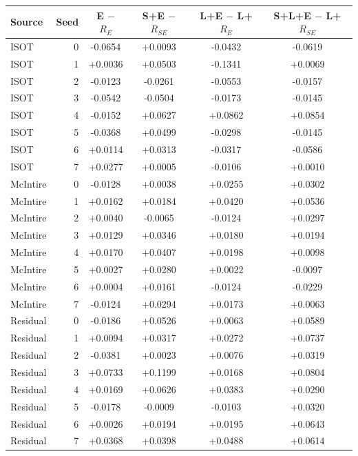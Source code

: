 \begin{tabular}{@{}lrcccc@{}}
\toprule
Source & Seed & E $-$ $R_E$ & S+E $-$ $R_{SE}$ & L+E $-$ L+$R_E$ & S+L+E $-$ L+$R_{SE}$\\
\midrule
ISOT & 0 & -0.0654 & +0.0093 & -0.0432 & -0.0619\\
ISOT & 1 & +0.0036 & +0.0503 & -0.1341 & +0.0069\\
ISOT & 2 & -0.0123 & -0.0261 & -0.0553 & -0.0157\\
ISOT & 3 & -0.0542 & -0.0504 & -0.0173 & -0.0145\\
ISOT & 4 & -0.0152 & +0.0627 & +0.0862 & +0.0854\\
ISOT & 5 & -0.0368 & +0.0499 & -0.0298 & -0.0145\\
ISOT & 6 & +0.0114 & +0.0313 & -0.0317 & -0.0586\\
ISOT & 7 & +0.0277 & +0.0005 & -0.0106 & +0.0010\\
McIntire & 0 & -0.0128 & +0.0038 & +0.0255 & +0.0302\\
McIntire & 1 & +0.0162 & +0.0184 & +0.0420 & +0.0536\\
McIntire & 2 & +0.0040 & -0.0065 & -0.0124 & +0.0297\\
McIntire & 3 & +0.0129 & +0.0346 & +0.0180 & +0.0194\\
McIntire & 4 & +0.0170 & +0.0407 & +0.0198 & +0.0098\\
McIntire & 5 & +0.0027 & +0.0280 & +0.0022 & -0.0097\\
McIntire & 6 & +0.0004 & +0.0161 & -0.0124 & -0.0229\\
McIntire & 7 & -0.0124 & +0.0294 & +0.0173 & +0.0063\\
Residual & 0 & -0.0186 & +0.0526 & +0.0063 & +0.0589\\
Residual & 1 & +0.0094 & +0.0317 & +0.0272 & +0.0737\\
Residual & 2 & -0.0381 & +0.0023 & +0.0076 & +0.0319\\
Residual & 3 & +0.0733 & +0.1199 & +0.0168 & +0.0804\\
Residual & 4 & +0.0169 & +0.0626 & +0.0383 & +0.0290\\
Residual & 5 & -0.0178 & -0.0009 & -0.0103 & +0.0320\\
Residual & 6 & +0.0026 & +0.0194 & +0.0195 & +0.0643\\
Residual & 7 & +0.0368 & +0.0398 & +0.0488 & +0.0614\\
\bottomrule
\end{tabular}
